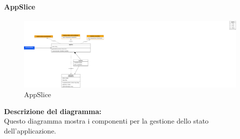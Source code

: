\paragraph{AppSlice}
\begin{figure}[h!] \centering
    \includegraphics[scale=0.2]{template/images/uml_front/logic/AppSlice.png}
    \caption{AppSlice}
\end{figure}
\textbf{Descrizione del diagramma:}\\
Questo diagramma mostra i componenti per la gestione dello stato dell'applicazione.
